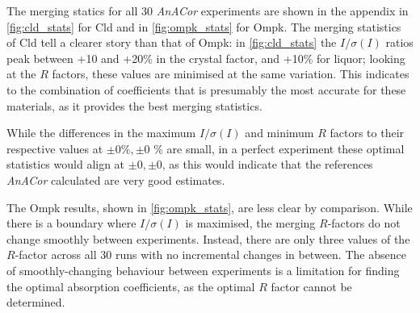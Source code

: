 The merging statics for all 30 \textit{AnACor} experiments are shown in the appendix in \cref{fig:cld_stats} for Cld and in \cref{fig:ompk_stats} for Ompk. The merging statistics of Cld tell a clearer story than that of Ompk: in \cref{fig:cld_stats} the $I/\sigma(I)$ ratios peak between +10 and +20\% in the crystal factor, and +10\% for liquor; looking at the $R$ factors, these values are minimised at the same variation. This indicates to the combination of coefficients that is presumably the most accurate for these materials, as it provides the best merging statistics.

While the differences in the maximum $I/\sigma(I)$ and minimum $R$ factors to their respective values at $\pm0 \%,\pm0$ \% are small, in a perfect experiment these optimal statistics would align at $\pm0,\pm0$, as this would indicate that the references \textit{AnACor} calculated are very good estimates. %

The Ompk results, shown in \cref{fig:ompk_stats}, are less clear by comparison. While there is a boundary where $I/\sigma(I)$ is maximised, the merging $R$-factors do not change smoothly between experiments. Instead, there are only three values of the $R$-factor across all 30 runs with no incremental changes in between. %
The absence of smoothly-changing behaviour between experiments is a limitation for finding the optimal absorption coefficients, as the optimal $R$ factor cannot be determined.%




